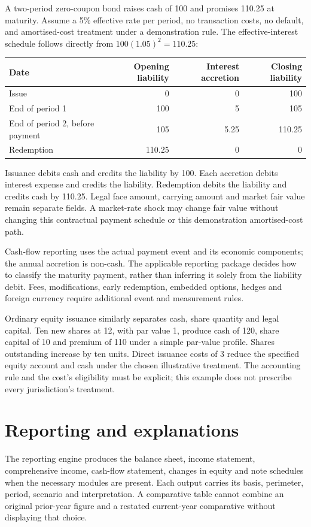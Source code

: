 A two-period zero-coupon bond raises cash of 100 and promises 110.25 at maturity.
Assume a 5\% effective rate per period, no transaction costs, no default, and
amortised-cost treatment under a demonstration rule. The effective-interest
schedule follows directly from $100(1.05)^2=110.25$:
\begin{center}
\begin{tabular}{lrrr}
\toprule Date & Opening liability & Interest accretion & Closing liability\\\midrule
Issue &0&0&100\\
End of period 1 &100&5&105\\
End of period 2, before payment &105&5.25&110.25\\
Redemption &110.25&0&0\\\bottomrule
\end{tabular}
\end{center}
Issuance debits cash and credits the liability by 100. Each accretion debits
interest expense and credits the liability. Redemption debits the liability
and credits cash by 110.25. Legal face amount, carrying amount and market
fair value remain separate fields. A market-rate shock may change fair value
without changing this contractual payment schedule or this demonstration
amortised-cost path.

Cash-flow reporting uses the actual payment event and its economic components;
the annual accretion is non-cash. The applicable reporting package decides how
to classify the maturity payment, rather than inferring it solely from the
liability debit. Fees, modifications, early redemption, embedded options,
hedges and foreign currency require additional event and measurement rules.

Ordinary equity issuance similarly separates cash, share quantity and legal
capital. Ten new shares at 12, with par value 1, produce cash of 120, share
capital of 10 and premium of 110 under a simple par-value profile. Shares
outstanding increase by ten units. Direct issuance costs of 3 reduce the
specified equity account and cash under the chosen illustrative treatment.
The accounting rule and the cost's eligibility must be explicit; this example
does not prescribe every jurisdiction's treatment.

\section{Reporting and explanations}

The reporting engine produces the balance sheet, income statement, comprehensive
income, cash-flow statement, changes in equity and note schedules when the
necessary modules are present. Each output carries its basis, perimeter,
period, scenario and interpretation. A comparative table cannot combine an
original prior-year figure and a restated current-year comparative without
displaying that choice.

